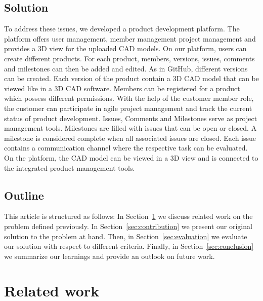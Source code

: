     \subsection*{Solution}
    To address these issues, we developed a product development platform. The platform offers user management, member management project management and provides a 3D view for the uploaded CAD models. On our platform, users can create different products. For each product, members, versions, issues, comments and milestones can then be added and edited. As in GitHub, different versions can be created. Each version of the product contain a 3D CAD model that can be viewed like in a 3D CAD software. Members can be registered for a product which possess different permissions. With the help of the customer member role, the customer can participate in agile project management and track the current status of product development. Issues, Comments and Milestones serve as project management tools. Milestones are filled with issues that can be open or closed. A milestone is considered complete when all associated issues are closed. Each issue contains a communication channel where the respective task can be evaluated. On the platform, the CAD model can be viewed in a 3D view and is connected to the integrated product management tools.

    \subsection*{Outline}
    This article is structured as follows:
    In Section~\ref{sec:differentiation} we discuss related work on the problem defined previously.
    In Section~\ref{sec:contribution} we present our original solution to the problem at hand.
    Then, in Section~\ref{sec:evaluation} we evaluate our solution with respect to different criteria.
    Finally, in Section~\ref{sec:conclusion} we summarize our learnings and provide an outlook on future work.
    
    \section{Related work}
    \label{sec:differentiation}

